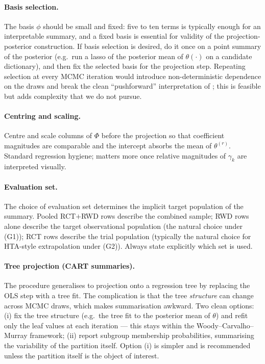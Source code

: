 \documentclass[11pt]{article}
\theoremstyle{plain}
\theoremstyle{definition}
\theoremstyle{remark}
\newcommand{\1}{\mathds{1}}
\begin{document}
\paragraph{Basis selection.} The basis $\phi$ should be small and fixed:
five to ten terms is typically enough for an interpretable summary, and a
fixed basis is essential for validity of the projection-posterior
construction. If basis selection is desired, do it once on a point summary
of the posterior (e.g.\ run a lasso of the posterior mean of $\theta(\cdot)$
on a candidate dictionary), and then fix the selected basis for the
projection step. Repeating selection at every MCMC iteration would
introduce non-deterministic dependence on the draws and break the clean
``pushforward'' interpretation of \citet{Woody2020}; this is feasible but
adds complexity that we do not pursue.

\paragraph{Centring and scaling.} Centre and scale columns of $\Phi$ before
the projection so that coefficient magnitudes are comparable and the
intercept absorbs the mean of $\theta^{(r)}$. Standard regression hygiene;
matters more once relative magnitudes of $\gamma_{k}$ are interpreted
visually.

\paragraph{Evaluation set.} The choice of evaluation set determines the
implicit target population of the summary. Pooled RCT$+$RWD rows describe
the combined sample; RWD rows alone describe the target observational
population (the natural choice under (G1)); RCT rows describe the trial
population (typically the natural choice for HTA-style extrapolation under
(G2)). Always state explicitly which set is used.

\paragraph{Tree projection (CART summaries).} The procedure generalises
to projection onto a regression tree by replacing the OLS step with a
tree fit. The complication is that the tree \emph{structure} can change
across MCMC draws, which makes summarisation awkward. Two clean options:
(i) fix the tree structure (e.g.\ the tree fit to the posterior mean of
$\theta$) and refit only the leaf values at each iteration --- this stays
within the Woody--Carvalho--Murray framework; (ii) report subgroup
membership probabilities, summarising the variability of the partition
itself. Option (i) is simpler and is recommended unless the partition
itself is the object of interest.
\end{document}
